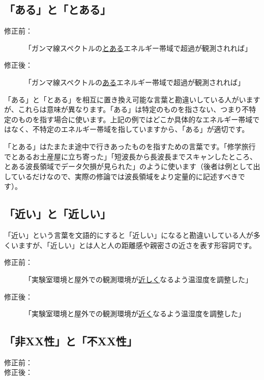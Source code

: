 \subsection{「ある」と「とある」}

\begin{description}
\item[修正前：]「ガンマ線スペクトルの\underline{とある}エネルギー帯域で超過が観測されれば」
\item[修正後：]「ガンマ線スペクトルの\underline{ある}エネルギー帯域で超過が観測されれば」
\end{description}

「ある」と「とある」を相互に置き換え可能な言葉と勘違いしている人がいますが、これらは意味が異なります。「ある」は特定のものを指さない、つまり不特定のものを指す場合に使います。上記の例ではどこか具体的なエネルギー帯域ではなく、不特定のエネルギー帯域を指していますから、「ある」が適切です。

「とある」はたまたま途中で行きあったものを指すための言葉です。「修学旅行でとあるお土産屋に立ち寄った」「短波長から長波長までスキャンしたところ、とある波長領域でデータ欠損が見られた」のように使います（後者は例として出しているだけなので、実際の修論では波長領域をより定量的に記述すべきです）。

\subsection{「近い」と「近しい」}

「近い」という言葉を文語的にすると「近しい」になると勘違いしている人が多くいますが、「近しい」とは人と人の距離感や親密さの近さを表す形容詞です。

\begin{description}
\item[修正前：]「実験室環境と屋外での観測環境が\underline{近しく}なるよう温湿度を調整した」
\item[修正後：]「実験室環境と屋外での観測環境が\underline{近く}なるよう温湿度を調整した」
\end{description}

\subsection{「非XX性」と「不XX性」}

\begin{description}
\item[修正前：]
\item[修正後：]
\end{description}

